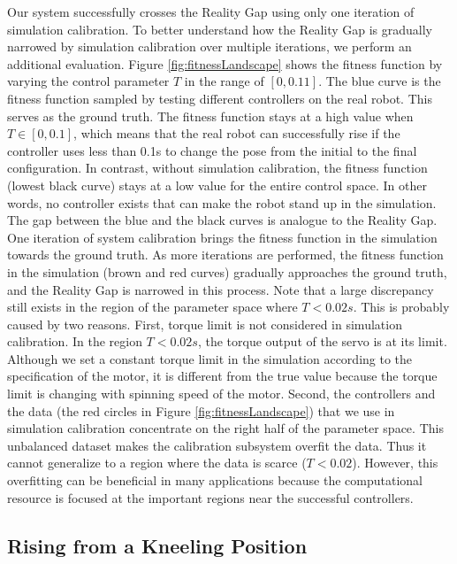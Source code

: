 Our system successfully crosses the Reality Gap using only one iteration of simulation calibration. To better understand how the Reality Gap is gradually narrowed by simulation calibration over multiple iterations, we perform an additional evaluation. Figure \ref{fig:fitnessLandscape} shows the fitness function by varying the control parameter $T$ in the range of $[0, 0.11]$. The blue curve is the fitness function sampled by testing different controllers on the real robot. This serves as the ground truth. The fitness function stays at a high value when $T\in[0, 0.1]$, which means that the real robot can successfully rise if the controller uses less than 0.1s to change the pose from the initial to the final configuration. In contrast, without simulation calibration, the fitness function (lowest black curve) stays at a low value for the entire control space. In other words, no controller exists that can make the robot stand up in the simulation. The gap between the blue and the black curves is analogue to the Reality Gap. One iteration of system calibration brings the fitness function in the simulation towards the ground truth. As more iterations are performed, the fitness function in the simulation (brown and red curves) gradually approaches the ground truth, and the Reality Gap is narrowed in this process. Note that a large discrepancy still exists in the region of the parameter space where $T<0.02s$. This is probably caused by two reasons. First, torque limit is not considered in simulation calibration. In the region $T<0.02s$, the torque output of the servo is at its limit. Although we set a constant torque limit in the simulation according to the specification of the motor, it is different from the true value because the torque limit is changing with spinning speed of the motor. Second, the controllers and the data (the red circles in Figure \ref{fig:fitnessLandscape}) that we use in simulation calibration concentrate on the right half of the parameter space. This unbalanced dataset makes the calibration subsystem overfit the data. Thus it cannot generalize to a region where the data is scarce ($T<0.02$). However, this overfitting can be beneficial in many applications because the computational resource is focused at the important regions near the successful controllers.

\subsection{Rising from a Kneeling Position}

